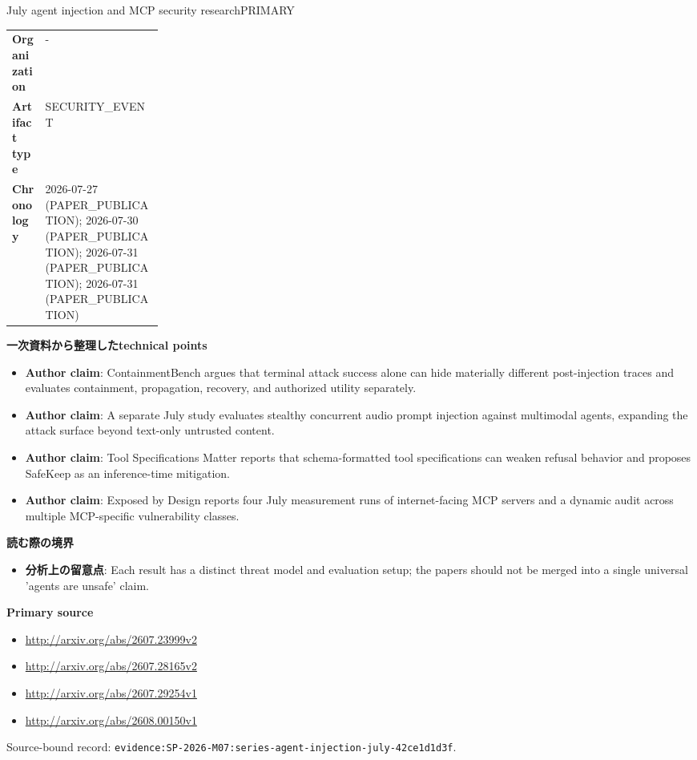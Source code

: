 \begin{technicalnote}{July agent injection and MCP security research}{PRIMARY}
\begin{tabularx}{\linewidth}{@{}>{\bfseries}p{0.22\linewidth}X@{}}
Organization & - \\
Artifact type & SECURITY\_EVENT \\
Chronology & 2026-07-27 (PAPER\_PUBLICATION); 2026-07-30 (PAPER\_PUBLICATION); 2026-07-31 (PAPER\_PUBLICATION); 2026-07-31 (PAPER\_PUBLICATION) \\
\end{tabularx}
\smallskip
{\bfseries 一次資料から整理したtechnical points}
\begin{itemize}[leftmargin=1.5em,itemsep=0.35em]
\item \textbf{Author claim}: ContainmentBench argues that terminal attack success alone can hide materially different post-injection traces and evaluates containment, propagation, recovery, and authorized utility separately.
\item \textbf{Author claim}: A separate July study evaluates stealthy concurrent audio prompt injection against multimodal agents, expanding the attack surface beyond text-only untrusted content.
\item \textbf{Author claim}: Tool Specifications Matter reports that schema-formatted tool specifications can weaken refusal behavior and proposes SafeKeep as an inference-time mitigation.
\item \textbf{Author claim}: Exposed by Design reports four July measurement runs of internet-facing MCP servers and a dynamic audit across multiple MCP-specific vulnerability classes.
\end{itemize}
{\bfseries 読む際の境界}
\begin{itemize}[leftmargin=1.5em,itemsep=0.35em]
\item \textbf{分析上の留意点}: Each result has a distinct threat model and evaluation setup; the papers should not be merged into a single universal 'agents are unsafe' claim.
\end{itemize}
{\bfseries Primary source}
\begin{itemize}[leftmargin=1.5em,itemsep=0.25em]
\item \url{http://arxiv.org/abs/2607.23999v2}
\item \url{http://arxiv.org/abs/2607.28165v2}
\item \url{http://arxiv.org/abs/2607.29254v1}
\item \url{http://arxiv.org/abs/2608.00150v1}
\end{itemize}
{\scriptsize\color{SurveyMuted}Source-bound record: \texttt{evidence:SP-2026-M07:series-agent-injection-july-42ce1d1d3f}.}
\end{technicalnote}
\medskip

